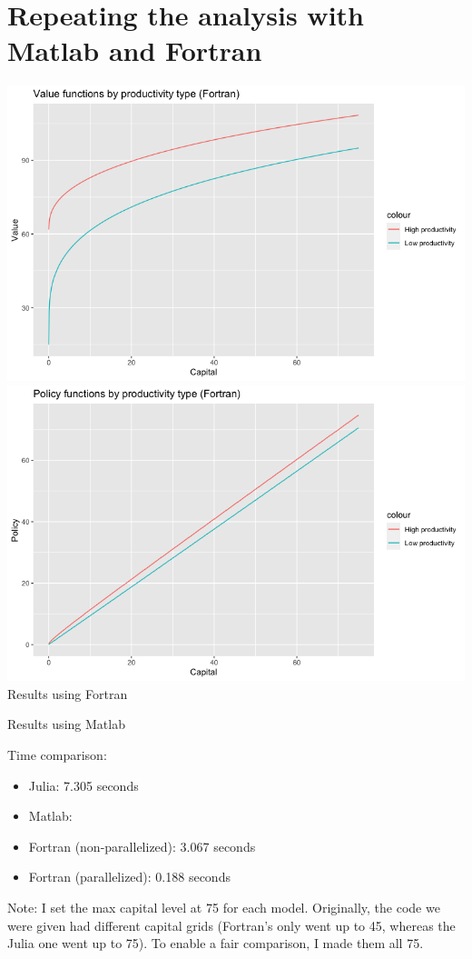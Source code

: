 \documentclass[12pt]{article}
\begin{document}
    \section{Repeating the analysis with Matlab and Fortran}
    \begin{center}
        \includegraphics[scale=0.4]{for_vf.png}\\
        \includegraphics[scale=0.4]{for_pf.png}\\
        Results using Fortran
    \end{center}
    \begin{center}
        Results using Matlab
    \end{center}
    Time comparison:
    \begin{itemize}
        \item Julia: 7.305 seconds
        \item Matlab: 
        \item Fortran (non-parallelized): 3.067 seconds
        \item Fortran (parallelized): 0.188 seconds
    \end{itemize}
    Note: I set the max capital level at 75 for each model. Originally, the code we were given had different capital grids (Fortran's only went up to 45, whereas the Julia one went up to 75). To enable a fair comparison, I made them all 75.
\end{document}
